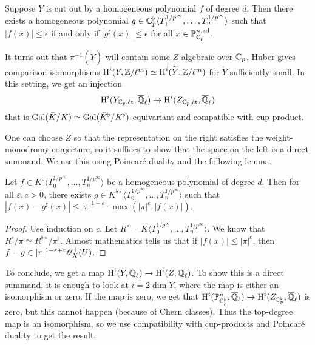 \documentclass{article}
\begin{document}
\begin{lemma}
Suppose $Y$ is cut out by a homogeneous polynomial $f$ of degree $d$. Then 
there exists a homogeneous polynomial 
$g\in \mathbb{C}_p^\flat\langle T_1^{1/p^\infty},\dots,T_n^{1/p^\infty}\rangle$ such 
that $|f(x)|\leqslant \epsilon$ if and only if $|g^\sharp(x)|\leqslant \epsilon$ 
for all $x\in \mathbb{P}_{\mathbb{C}_p}^{n,\textnormal{ad}}$. 
\end{lemma}

It turns out that $\pi^{-1}(\widetilde Y)$ will contain some $Z$ algebraic 
over $\mathbb{C}_p$. Huber gives comparison isomorphisms 
$\operatorname{H}^i(Y,\mathbb{Z}/\ell^m)\simeq \operatorname{H}^i(\widetilde Y,\mathbb{Z}/\ell^m)$ for $\widetilde Y$ 
sufficiently small. In this setting, we get an injection   
\[
  \operatorname{H}^i(Y_{\mathbb{C}_p,\textnormal{\'et}},\overline{\mathbb{Q}}_\ell) \to \operatorname{H}^i(Z_{\mathbb{C}_p,\textnormal{\'et}},\overline{\mathbb{Q}}_\ell)
\]
that is $\operatorname{Gal}(\bar K/K)\simeq \operatorname{Gal}(\bar K^\flat/K^\flat)$-equivariant and 
compatible with cup product. 

One can choose $Z$ so that the representation on the right satisfies the 
weight-monodromy conjecture, so it suffices to show that the space on the left 
is a direct summand. We use this using Poincar\'e duality and the following 
lemma. 

\begin{lemma}
Let $f\in K^\circ\langle T_0^{1/p^\infty},\dots,T_n^{1/p^\infty}\rangle$ be a 
homogeneous polynomial of degree $d$. Then for all $\varepsilon,c>0$, there 
exists $g\in K^{\flat\circ}\langle T_0^{1/p^\infty},\dots,T_n^{1/p^\infty}\rangle$ 
such that $|f(x)-g^\sharp(x)|\leqslant |\pi|^{1-\varepsilon} \cdot \max(|\pi|^c,|f(x)|)$. 
\end{lemma}
\begin{proof}
Use induction on $c$. Let $R^\circ=K\langle T_0^{1/p^\infty},\dots,T_n^{1/p^\infty}\rangle$. 
We know that $R^\circ/\pi\simeq R^{\flat\circ}/\pi^\flat$. Almost mathematics tells 
us that if $|f(x)|\leqslant |\pi|^c$, then $f-g\in |\pi|^{1-\varepsilon+c} \mathscr{O}_X^+(U)$. 
\end{proof}

To conclude, we get a map $\operatorname{H}^i(Y,\overline{\mathbb{Q}}_\ell)\to \operatorname{H}^i(Z,\overline{\mathbb{Q}}_\ell)$. 
To show this is a direct summand, it is enough to look at $i=2\dim Y$, where the 
map is either an isomorphism or zero. If the map is zero, we get that 
$\operatorname{H}^i(\mathbb{P}_{\mathbb{C}_p^\flat}^n,\overline{\mathbb{Q}}_\ell) \to \operatorname{H}^i(Z_{\mathbb{C}_p^\flat},\overline{\mathbb{Q}}_\ell)$ 
is zero, but this cannot happen (because of Chern classes). Thus the top-degree 
map is an isomorphism, so we use compatibility with cup-products and Poincar\'e 
duality to get the result. 
\end{document}
